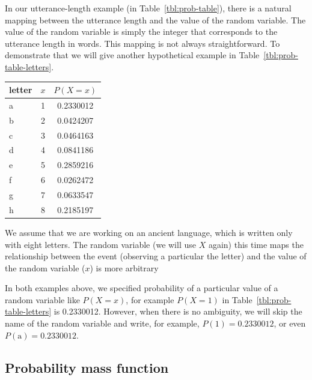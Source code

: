 In our utterance-length example (in Table~\ref{tbl:prob-table}),
there is a natural mapping between the utterance length
and the value of the random variable.
The value of the random variable is simply the integer
that corresponds to the utterance length in words.
This mapping is not always straightforward.
To demonstrate that we will give another hypothetical example
in Table~\ref{tbl:prob-table-letters}.
\begin{margintable}
  \caption{\label{tbl:prob-table-letters}%
    Probability distribution of variable $X$,
    associated with letter probabilities.
    Note that the mapping between the letters
    and the values of the random variable $x$ is arbitrary.
  }
  \begin{center}
    \begin{tabular}{lSS[round-precision=3]}
      \toprule
      letter & $x$ & {$P(X = x)$} \\
      \midrule
      a & 1&0.2330012\\
      b & 2&0.0424207\\
      c & 3&0.0464163\\
      d & 4&0.0841186\\
      e & 5&0.2859216\\
      f & 6&0.0262472\\
      g & 7&0.0633547\\
      h & 8&0.2185197\\
      \bottomrule
    \end{tabular}
  \end{center}
\end{margintable}
We assume that we are working on an ancient language,
which is written only with eight letters.
The random variable (we will use $X$ again) this time maps
the relationship between the event (observing a particular the letter) and
the value of the random variable ($x$) is more arbitrary

In both examples above,
we specified probability of a particular value of a random variable like $P(X=x)$,
for example $P(X=1)$
in Table~\ref{tbl:prob-table-letters} is \num{0.2330012}.
However, when there is no ambiguity,
we will skip the name of the random variable and write, for example,
$P(1) = \num{0.2330012}$, or even $P(\text{a}) = \num{0.2330012}$.

\subsection{Probability mass function}

